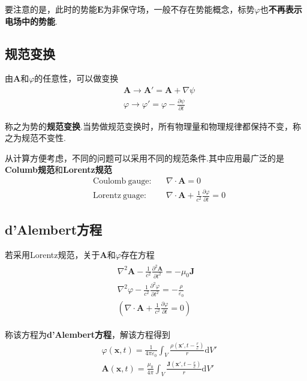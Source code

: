 \documentclass[main.tex]{subfiles}
\begin{document}
要注意的是，此时的势能$\boldsymbol{E}$为非保守场，一般不存在势能概念，标势$\varphi$也\textbf{不再表示电场中的势能}.

\subsection{规范变换}
由$\boldsymbol{A}$和$\varphi$的任意性，可以做变换
\begin{align}
    &\boldsymbol{A} \to \boldsymbol{A}' = \boldsymbol{A} + \nabla \psi\\
    &\varphi \to \varphi ' = \varphi - \frac{\partial \psi}{\partial t}
\end{align}

称之为势的\textbf{规范变换}.当势做规范变换时，所有物理量和物理规律都保持不变，称之为规范不变性.

从计算方便考虑，不同的问题可以采用不同的规范条件.其中应用最广泛的是\textbf{Columb规范}和\textbf{Lorentz规范}
\begin{align}
&\mathrm{Coulomb\ gauge:} &&\nabla \cdot \boldsymbol{A}  = 0 \\
&\mathrm{Lorentz\ guage:}  &&\nabla \cdot \boldsymbol{A} +\frac{1}{c^2}\frac{\partial \varphi }{\partial  t}  = 0
\end{align}

\subsection{d'Alembert方程}
若采用Lorentz规范，关于$\boldsymbol{A}$和$\varphi$存在方程
\begin{align}
    \label{d'Alembert}\begin{array}{c}
    \nabla ^2 \boldsymbol{A} - \frac{1}{c^2}\frac{\partial ^2 \boldsymbol{A}}{\partial t^2} = -\mu _0 \boldsymbol{J}\\
    \nabla ^2 \varphi  - \frac{1}{c^2}\frac{\partial ^2 \varphi }{\partial t^2} = -\frac{\rho}{\varepsilon _0}\\
    \left(\nabla \cdot \boldsymbol{A} +\frac{1}{c^2}\frac{\partial \varphi }{\partial  t}  = 0\right)
\end{array}    
\end{align}

称该方程为\textbf{d'Alembert方程}，解该方程得到
\begin{align}
    &\varphi(\boldsymbol{x},t) = \frac{1}{4\pi \varepsilon _0} \int_V \frac{\displaystyle \rho \left(\boldsymbol{x}' ,t - \frac{r}{c} \right)}{r} \mathrm{d}V'\\
    \label{solvedalembertA}&\boldsymbol{A}(\boldsymbol{x},t) = \frac{\mu _0}{4\pi } \int_V \frac{\displaystyle \boldsymbol{J} \left(\boldsymbol{x}' ,t - \frac{r}{c} \right)}{r} \mathrm{d}V'
\end{align}
\end{document}
